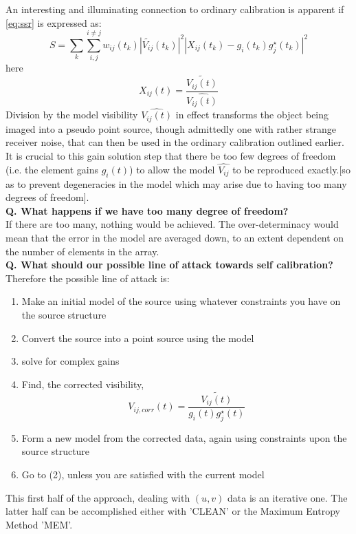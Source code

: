 \documentclass[10pt]{report}
\newcommand{\tbf}[1]{\textbf{#1}}
\begin{document}
An interesting and illuminating connection to ordinary calibration is apparent if \eqref{eq:ssr} is expressed as:
\begin{equation}
S=\sum_k \sum_{i,j}^{i \neq j} w_{ij}(t_k) |\tilde{V_{ij}}(t_k)|^2 |X_{ij}(t_k)-g_i(t_k)g^\star_j(t_k)|^2 
\end{equation}
here 
\begin{equation}
X_{ij}(t)=\frac{\tilde{V_{ij}(t)}}{\hat{V_{ij}(t)}}
\end{equation}
Division by the model visibility $\hat{V_{ij}(t)}$ in effect transforms the object being imaged into a pseudo point source, though admittedly one with rather strange receiver noise, that can then be used in the ordinary calibration outlined earlier.\\

It is crucial to this gain solution step that there be too few degrees of freedom (i.e. the element gains $g_i(t)$) to allow the model $\hat{V_{ij}}$ to be reproduced exactly.[so as to prevent degeneracies in the model which may arise due to having too many degrees of freedom].\\

\tbf{Q. What happens if we have too many degree of freedom?}\\

If there are too many, nothing would be achieved. The over-determinacy would mean that the error in the model are averaged down, to an extent dependent on the number of elements in the array.\\

\tbf{Q. What should our possible line of attack towards self calibration?}\\

Therefore the possible line of attack is:
\begin{enumerate}
\item Make an initial model of the source using whatever constraints you have on the source structure
\item Convert the source into a point source using the model
\item solve for complex gains
\item Find, the corrected visibility,
\begin{equation}
V_{ij,corr}(t)=\frac{\tilde{V_{ij}(t)}}{g_i(t)g^\star_j(t)}
\end{equation}
\item Form a new model from the corrected data, again using constraints upon the source structure
\item Go to (2), unless you are satisfied with the current model
\end{enumerate}
This first half of the approach, dealing with $(u,v)$ data is an iterative one. The latter half can be accomplished either with 'CLEAN' or the Maximum Entropy Method 'MEM'.
\end{document}

